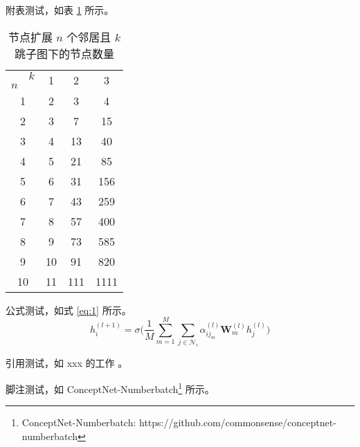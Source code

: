 附表测试，如表 \ref{tab:4:k-hop-n-near-node-num} 所示。
\begin{table}[]
  \centering
  \caption{节点扩展 $n$ 个邻居且 $k$ 跳子图下的节点数量}
  \label{tab:4:k-hop-n-near-node-num}
  \begin{tabular}{cc|ccc}
    \toprule
                            & $k$ & \multirow{2}{*}{1} & \multirow{2}{*}{2} & \multirow{2}{*}{3} \\
    $n$                     &     &                    &                    &                    \\
    \midrule
    \multicolumn{2}{c|}{1}  & 2   & 3                  & 4                                       \\
    \multicolumn{2}{c|}{2}  & 3   & 7                  & 15                                      \\
    \multicolumn{2}{c|}{3}  & 4   & 13                 & 40                                      \\
    \multicolumn{2}{c|}{4}  & 5   & 21                 & 85                                      \\
    \multicolumn{2}{c|}{5}  & 6   & 31                 & 156                                     \\
    \multicolumn{2}{c|}{6}  & 7   & 43                 & 259                                     \\
    \multicolumn{2}{c|}{7}  & 8   & 57                 & 400                                     \\
    \multicolumn{2}{c|}{8}  & 9   & 73                 & 585                                     \\
    \multicolumn{2}{c|}{9}  & 10  & 91                 & 820                                     \\
    \multicolumn{2}{c|}{10} & 11  & 111                & 1111                                    \\
    \bottomrule
  \end{tabular}
\end{table}

公式测试，如式 \ref{eq:1} 所示。
\begin{equation}
  \label{eq:1}
  h_i^{(l+1)}=\sigma\Bigg(\frac{1}{M}\sum_{m=1}^{M}\sum_{j\in\mathcal{N}_i}\alpha_{{ij}_m}^{(l)}\textbf{W}^{(l)}_{m}h_{j}^{(l)}\Bigg)
\end{equation}

引用测试，如 xxx 的工作 \cite{zhao-etal-2020-ecnu}。

脚注测试，如 ConceptNet-Numberbatch\footnote{ConceptNet-Numberbatch: https://github.com/commonsense/conceptnet-numberbatch} 所示。

